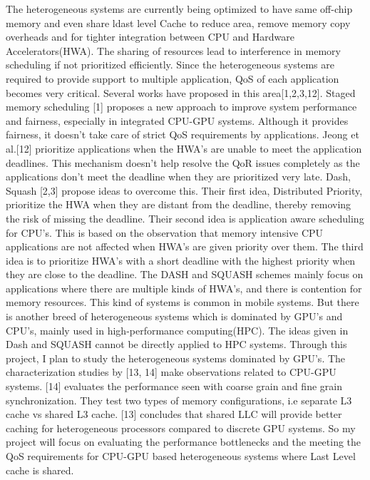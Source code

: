 The heterogeneous systems are currently being optimized to have same off-chip memory and even share ldast level Cache to reduce area, remove memory copy overheads and for tighter integration between CPU and Hardware Accelerators(HWA).  The sharing of resources lead to interference in memory scheduling if not prioritized efficiently. Since the heterogeneous systems are required to provide support to multiple application, QoS of each application becomes very critical. Several works have proposed in this area[1,2,3,12]. Staged memory scheduling [1] proposes a new approach to improve system performance and fairness, especially in integrated CPU-GPU systems. Although it provides fairness, it doesn’t take care of strict QoS requirements by applications. Jeong et al.[12] prioritize applications when the HWA’s are unable to meet the application deadlines. This mechanism doesn’t help resolve the QoR issues completely as the applications don't meet the deadline when they are prioritized very late.  Dash, Squash [2,3] propose ideas to overcome this. Their first idea, Distributed Priority, prioritize the HWA when they are distant from the deadline, thereby removing the risk of missing the deadline.  Their second idea is application aware scheduling for CPU’s.  This is based on the observation that memory intensive CPU applications are not affected when HWA’s are given priority over them. The third idea is to prioritize HWA’s with a short deadline with the highest priority when they are close to the deadline.\newline
The DASH and SQUASH schemes mainly focus on applications where there are multiple kinds of HWA’s, and there is contention for memory resources. This kind of systems is common in mobile systems. But there is another breed of heterogeneous systems which is dominated by GPU’s and CPU’s, mainly used in high-performance computing(HPC). The ideas given in Dash and SQUASH cannot be directly applied to HPC systems. Through this project, I plan to study the heterogeneous systems dominated by GPU’s. The characterization studies by [13, 14] make observations related to CPU-GPU systems.  [14] evaluates the performance seen with coarse grain and fine grain synchronization. They test two types of memory configurations, i.e separate L3 cache vs shared L3 cache. [13] concludes that shared LLC will provide better caching for heterogeneous processors compared to discrete GPU systems. So my project will focus on evaluating the performance bottlenecks and the meeting the QoS requirements for CPU-GPU based heterogeneous systems where Last Level cache is shared.\newline


